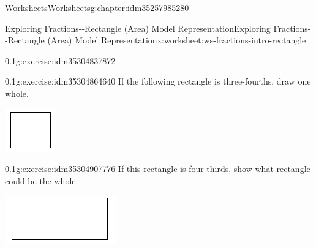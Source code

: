 \documentclass[twoside,11pt,]{book}
\begin{document}
\begin{chapterptx}{Worksheets}{}{Worksheets}{}{}{g:chapter:idm35257985280}
\begin{worksheet-section-numberless}{Exploring Fractions-{}-{}Rectangle (Area) Model Representation}{}{Exploring Fractions-{}-{}Rectangle (Area) Model Representation}{}{}{x:worksheet:ws-fractions-intro-rectangle}
\begin{divisionexercise}{2}{}{0.1}{g:exercise:idm35304837872}
\begin{sidebyside}{1}{0.3}{0.3}{0}
\begin{sbspanel}{0.4}
\end{sbspanel}%
\end{sidebyside}%
%
\end{divisionexercise}%
\begin{divisionexercise}{3}{}{0.1}{g:exercise:idm35304864640}%
If the following rectangle is three-fourths, draw one whole. \begin{sidebyside}{1}{0.35}{0.35}{0}%
\begin{sbspanel}{0.3}%
\includegraphics[width=1\linewidth]{images/generic-square.png}
\end{sbspanel}%
\end{sidebyside}%
%
\end{divisionexercise}%
\clearpage
\begin{divisionexercise}{4}{}{0.1}{g:exercise:idm35304907776}%
If this rectangle is four-thirds, show what rectangle could be the whole. \begin{sidebyside}{1}{0.3}{0.3}{0}%
\begin{sbspanel}{0.4}%
\includegraphics[width=1\linewidth]{images/generic-rectangle.png}

\end{sbspanel}
\end{sidebyside}
\end{divisionexercise}
\end{worksheet-section-numberless}
\end{chapterptx}
\end{document}
